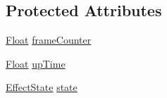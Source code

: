 \subsection*{Protected Attributes}
\begin{DoxyCompactItemize}
\item 
\hyperlink{namespaceZeta_a1e0a1265f9b3bd3075fb0fabd39088ba}{Float} \hyperlink{classZeta_1_1DurableEffect_ae4d3f95cb12a14ab8b592e3344643b9d}{frame\+Counter}
\item 
\hyperlink{namespaceZeta_a1e0a1265f9b3bd3075fb0fabd39088ba}{Float} \hyperlink{classZeta_1_1DurableEffect_ab8ee9c3e4b0a65c2c150b3baadd2ca5c}{up\+Time}
\item 
\hyperlink{classZeta_1_1DurableEffect_abcf4ec499ab94dbad5b1e6aeb45d6ba4}{Effect\+State} \hyperlink{classZeta_1_1DurableEffect_a4ab32aaf7391e368086aba8e2030d9f6}{state}
\end{DoxyCompactItemize}


